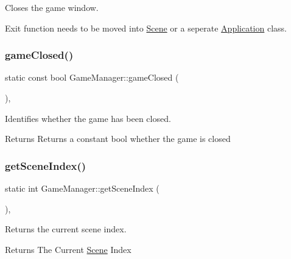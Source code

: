 Closes the game window. 

Exit function needs to be moved into \hyperlink{class_scene}{Scene} or a seperate \hyperlink{class_application}{Application} class. \mbox{\label{class_game_manager_a4eb94c6171bf3292eb57b291e2174289}} 
\subsubsection{\texorpdfstring{game\+Closed()}{gameClosed()}}
{\footnotesize\ttfamily static const bool Game\+Manager\+::game\+Closed (\begin{DoxyParamCaption}{ }\end{DoxyParamCaption})\hspace{0.3cm}{\ttfamily [inline]}, {\ttfamily [static]}}



Identifies whether the game has been closed. 

\begin{DoxyReturn}{Returns}
Returns a constant bool whether the game is closed 
\end{DoxyReturn}
\mbox{\label{class_game_manager_aa4835b5fc96bfdbf6170a8673baf5552}} 
\subsubsection{\texorpdfstring{get\+Scene\+Index()}{getSceneIndex()}}
{\footnotesize\ttfamily static int Game\+Manager\+::get\+Scene\+Index (\begin{DoxyParamCaption}{ }\end{DoxyParamCaption})\hspace{0.3cm}{\ttfamily [inline]}, {\ttfamily [static]}}



Returns the current scene index. 

\begin{DoxyReturn}{Returns}
The Current \hyperlink{class_scene}{Scene} Index 
\end{DoxyReturn}
\mbox{\label{class_game_manager_a0a4c03ef0451371a98204c18c1faf9fd}} 
